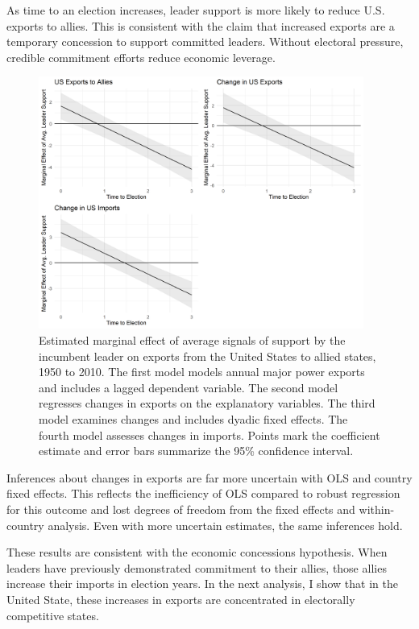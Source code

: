 \documentclass[12pt]{article}
\begin{document}
As time to an election increases, leader support is more likely to reduce U.S. exports to allies. 
This is consistent with the claim that increased exports are a temporary concession to support committed leaders.
Without electoral pressure, credible commitment efforts reduce economic leverage.


\begin{figure}[htpb]
	\centering
		\includegraphics[width=0.95\textwidth]{../figures/me-plots-us.png}
	\caption{Estimated marginal effect of average signals of support by the incumbent leader on exports from the United States to allied states, 1950 to 2010. The first model models annual major power exports and includes a lagged dependent variable. The second model regresses changes in exports on the explanatory variables. The third model examines changes and includes dyadic fixed effects. The fourth model assesses changes in imports. Points mark the coefficient estimate and error bars summarize the 95\% confidence interval.}
	\label{fig:me-plots-us}
\end{figure}


Inferences about changes in exports are far more uncertain with OLS and country fixed effects. 
This reflects the inefficiency of OLS compared to robust regression for this outcome and lost degrees of freedom from the fixed effects and within-country analysis. 
Even with more uncertain estimates, the same inferences hold. 


These results are consistent with the economic concessions hypothesis. 
When leaders have previously demonstrated commitment to their allies, those allies increase their imports in election years.
In the next analysis, I show that in the United State, these increases in exports are concentrated in electorally competitive states.
\end{document}
